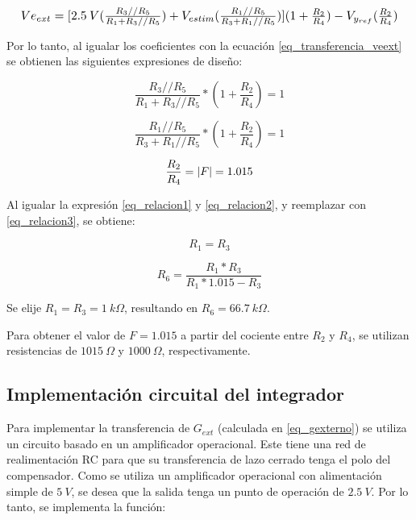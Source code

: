 \begin{equation*}
	\resizebox{.99\hsize}{!}
	{
		$
		Ve_{ext}= [2.5\:V (\frac{R_3//R_5}{R_1+R_3//R_5})+V_{estim}(\frac{R_1//R_5}{R_3+R_1//R_5})](1+\frac{R_2}{R_4})-V_{y_{ref}}(\frac{R_2}{R_4})
		$
	}
\end{equation*}


Por lo tanto, al igualar los coeficientes con la ecuación \ref{eq_transferencia_veext} se obtienen las siguientes expresiones de diseño:


\begin{equation} \label{eq_relacion1}
	\frac{R_3//R_5}{R_1+R_3//R_5}*(1+\frac{R_2}{R_4})=1
\end{equation}

\begin{equation} \label{eq_relacion2}
	\frac{R_1//R_5}{R_3+R_1//R_5}*(1+\frac{R_2}{R_4})=1
\end{equation}

\begin{equation} \label{eq_relacion3} 
	\frac{R_2}{R_4}=\lvert F\rvert=1.015
\end{equation}

Al igualar la expresión \ref{eq_relacion1} y \ref{eq_relacion2}, y reemplazar con \ref{eq_relacion3}, se obtiene:

\begin{equation*} 
	R_1 = R_3
\end{equation*}

\begin{equation*} 
	R_6=\frac{R_1*R_3}{R_1*1.015-R_3}
\end{equation*}

Se elije $R_1=R_3=1\:k\Omega$, resultando en $R_6=66.7\:k\Omega$.

Para obtener el valor de $F=1.015$ a partir del cociente entre  $R_2$  y $R_4$, se utilizan resistencias de $1015\:\Omega$ y $1000\:\Omega$, respectivamente.

\subsection{Implementación circuital del integrador}

Para implementar la transferencia de $G_{ext}$ (calculada en \ref{eq_gexterno}) se utiliza un circuito basado en un amplificador operacional. Este tiene una red de realimentación RC para que su transferencia de lazo cerrado tenga el polo del compensador. Como se utiliza un amplificador operacional con alimentación simple de $5\:V$, se desea que la salida tenga un punto de operación de $2.5\:V$. Por lo tanto, se implementa la función:

